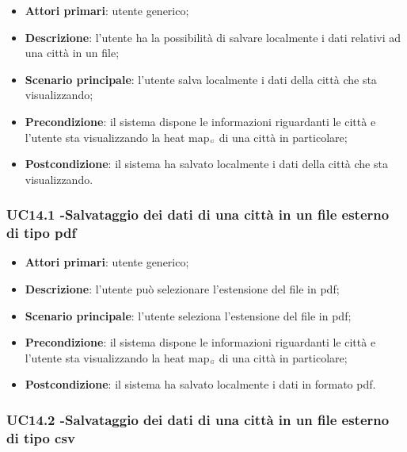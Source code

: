 \begin{itemize}
	\item \textbf{Attori primari}: utente generico;
	\item \textbf{Descrizione}: l’utente ha la possibilità di salvare localmente i dati relativi ad una città in un file;
	\item \textbf{Scenario principale}: l’utente salva localmente i dati della città che sta visualizzando;
	\item \textbf{Precondizione}: il sistema dispone le informazioni riguardanti le città e  l’utente sta visualizzando la heat map$_{\scaleto{G}{3pt}}$ di una città in particolare;
	\item \textbf{Postcondizione}: il sistema ha salvato localmente i dati della città che sta visualizzando.
\end{itemize}

\subsubsection{UC14.1 -Salvataggio dei dati di una città in un file esterno di tipo pdf}\label{CasiDUsoCasiDUsoFacoltativiTraUnUtenteEIlFrontEndElencoCasiDUsoUC141SalvataggioDeiDatiDiUnaCittaInUnFileEsternoDiTipoPdf}

\begin{itemize}
	\item \textbf{Attori primari}: utente generico;
	\item \textbf{Descrizione}: l’utente può selezionare l’estensione del file in pdf;
	\item \textbf{Scenario principale}: l’utente seleziona l’estensione del file in pdf;
	\item \textbf{Precondizione}: il sistema dispone le informazioni riguardanti le città e  l’utente sta visualizzando la heat map$_{\scaleto{G}{3pt}}$ di una città in particolare;
	\item \textbf{Postcondizione}: il sistema ha salvato localmente i dati in formato pdf.
\end{itemize}

\subsubsection{UC14.2 -Salvataggio dei dati di una città in un file esterno di tipo csv}\label{CasiDUsoCasiDUsoFacoltativiTraUnUtenteEIlFrontEndElencoCasiDUsoUC142SalvataggioDeiDatiDiUnaCittaInUnFileEsternoDiTipoCsv}

